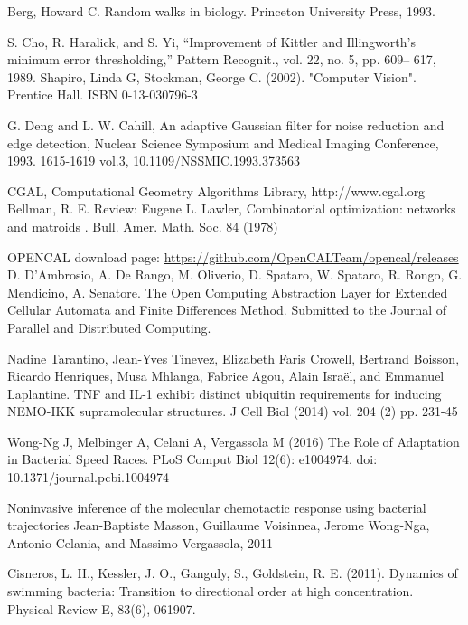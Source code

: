 \documentclass[conference]{IEEEtran}
\begin{document}
\begin{thebibliography}{1}

Berg, Howard C. Random walks in biology. Princeton University Press, 1993.

S. Cho, R. Haralick, and S. Yi, ``Improvement of Kittler and Illingworth’s minimum error thresholding,'' Pattern Recognit., vol. 22, no. 5, pp. 609– 617, 1989.
Shapiro, Linda G, Stockman, George C. (2002). "Computer Vision". Prentice Hall. ISBN 0-13-030796-3

G. Deng and L. W. Cahill, An adaptive Gaussian filter for noise reduction and edge detection, Nuclear Science Symposium and Medical Imaging Conference, 1993. 1615-1619 vol.3, 10.1109/NSSMIC.1993.373563

CGAL, Computational Geometry Algorithms Library, http://www.cgal.org
Bellman, R. E. Review: Eugene L. Lawler, Combinatorial optimization: networks and matroids . 
 Bull. Amer. Math. Soc. 84 (1978)



OPENCAL download page: \url{https://github.com/OpenCALTeam/opencal/releases}
D. D'Ambrosio, A. De Rango, M. Oliverio, D. Spataro, W. Spataro, R. Rongo, G. Mendicino, A. Senatore. The Open Computing Abstraction Layer for Extended Cellular Automata and Finite Differences Method. Submitted to the Journal of Parallel and Distributed Computing.

Nadine Tarantino, Jean-Yves Tinevez, Elizabeth Faris Crowell, Bertrand Boisson, Ricardo Henriques, Musa Mhlanga, Fabrice Agou, Alain Israël, and Emmanuel Laplantine. TNF and IL-1 exhibit distinct ubiquitin requirements for inducing NEMO-IKK supramolecular structures. J Cell Biol (2014) vol. 204 (2) pp. 231-45


Wong-Ng J, Melbinger A, Celani A, Vergassola M (2016) The Role of Adaptation in Bacterial Speed Races. PLoS Comput Biol 12(6): e1004974. doi: 10.1371/journal.pcbi.1004974

Noninvasive inference of the molecular chemotactic response using bacterial trajectories Jean-Baptiste Masson, Guillaume Voisinnea, Jerome Wong-Nga, Antonio Celania, and Massimo Vergassola, 2011

Cisneros, L. H., Kessler, J. O., Ganguly, S.,  Goldstein, R. E. (2011). Dynamics of swimming bacteria: Transition to directional order at high concentration. Physical Review E, 83(6), 061907.


\end{thebibliography}
\end{document}
